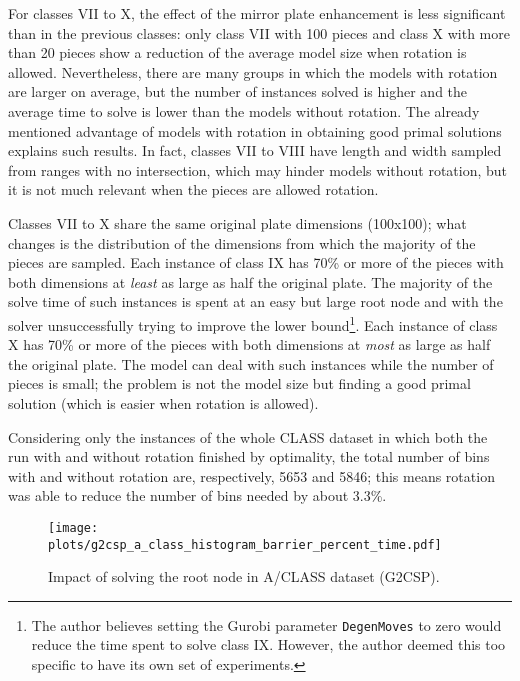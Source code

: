 For classes VII to X, the effect of the mirror plate enhancement is less significant than in the previous classes: only class VII with 100 pieces and class X with more than 20 pieces show a reduction of the average model size when rotation is allowed.
Nevertheless, there are many groups in which the models with rotation are larger on average, but the number of instances solved is higher and the average time to solve is lower than the models without rotation.
The already mentioned advantage of models with rotation in obtaining good primal solutions explains such results.
In fact, classes VII to VIII have length and width sampled from ranges with no intersection, which may hinder models without rotation, but it is not much relevant when the pieces are allowed rotation.

Classes VII to X share the same original plate dimensions (100x100); what changes is the distribution of the dimensions from which the majority of the pieces are sampled.
Each instance of class IX has 70\% or more of the pieces with both dimensions at \emph{least} as large as half the original plate.
The majority of the solve time of such instances is spent at an easy but large root node and with the solver unsuccessfully trying to improve the lower bound\footnote{The author believes setting the Gurobi parameter \texttt{DegenMoves} to zero would reduce the time spent to solve class IX. However, the author deemed this too specific to have its own set of experiments.}.
Each instance of class X has 70\% or more of the pieces with both dimensions at \emph{most} as large as half the original plate.
The model can deal with such instances while the number of pieces is small; the problem is not the model size but finding a good primal solution (which is easier when rotation is allowed).

Considering only the instances of the whole CLASS dataset in which both the run with and without rotation finished by optimality, the total number of bins with and without rotation are, respectively, 5653 and 5846; this means rotation was able to reduce the number of bins needed by about 3.3\%.

\begin{figure}[!htbp]
  \caption{Impact of solving the root node in A/CLASS dataset (G2CSP).}
  \center
  \texttt{[image: plots/g2csp\_a\_class\_histogram\_barrier\_percent\_time.pdf]}
  \label{fig:g2mkp_cw_histogram_barrier_percent_time}
\end{figure}

